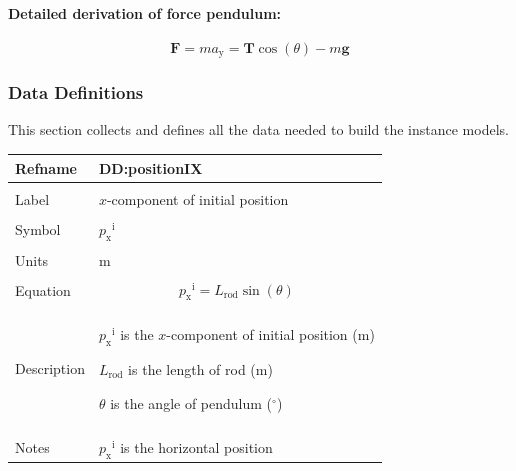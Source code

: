 \documentclass[12pt]{article}
\begin{document}
\paragraph{Detailed derivation of force pendulum:}
\label{GD:vForceOnPendulumDeriv}
\begin{displaymath}
\mathbf{F}=m {a_{\text{y}}}=\mathbf{T} \cos\left(θ\right)-m \mathbf{g}
\end{displaymath}
\subsubsection{Data Definitions}
\label{Sec:DDs}
This section collects and defines all the data needed to build the instance models.

\vspace{\baselineskip}
\noindent
\begin{minipage}{\textwidth}
\begin{tabular}{>{\raggedright}p{}>{\raggedright\arraybackslash}p{}}
\toprule \textbf{Refname} & \textbf{DD:positionIX}
\label{DD:positionIX}
\\ \midrule \\
Label & $x$-component of initial position
        
\\ \midrule \\
Symbol & ${{p_{\text{x}}}^{\text{i}}}$
         
\\ \midrule \\
Units & ${\text{m}}$
        
\\ \midrule \\
Equation & \begin{displaymath}
           {{p_{\text{x}}}^{\text{i}}}={L_{\text{rod}}} \sin\left(θ\right)
           \end{displaymath}
\\ \midrule \\
Description & \begin{symbDescription}
              \item{${{p_{\text{x}}}^{\text{i}}}$ is the $x$-component of initial position (${\text{m}}$)}
              \item{${L_{\text{rod}}}$ is the length of rod (${\text{m}}$)}
              \item{$θ$ is the angle of pendulum (${{}^{\circ}}$)}
              \end{symbDescription}
\\ \midrule \\
Notes & ${{p_{\text{x}}}^{\text{i}}}$ is the horizontal position
        

\end{tabular}
\end{minipage}
\end{document}
